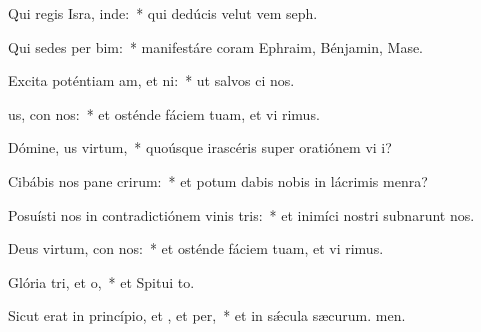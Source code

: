 \item Qui regis Isra, inde:~* qui dedúcis velut vem seph.
\item Qui sedes per bim:~* manifestáre coram Ephraim, Bénjamin,  Mase.
\item Excita poténtiam am, et ni:~* ut salvos ci nos.
\item {}us, con nos:~* et osténde fáciem tuam, et vi rimus.
\item Dómine, us virtum,~* quoúsque irascéris super oratiónem vi i?
\item Cibábis nos pane crirum:~* et potum dabis nobis in lácrimis  menra?
\item Posuísti nos in contradictiónem vinis tris:~* et inimíci nostri subnarunt nos.
\item Deus virtum, con nos:~* et osténde fáciem tuam, et vi rimus.
\item Glória tri, et o,~* et Spitui to.
\item Sicut erat in princípio, et , et per,~* et in sǽcula sæcurum. men.
